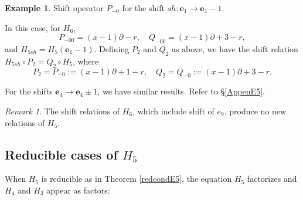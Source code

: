 \documentclass[a4paper,12pt]{article}
\theoremstyle{definition}
\newtheorem{example}[thm]{Example}
\theoremstyle{remark}
\newtheorem{remark}[thm]{Remark}
\numberwithin{equation}{section} %
\begin{document}
\begin{example} Shift operator $P_{-0}$ for the shift $sh:{\bm e}_1\to{\bm e}_1-1.$\par
\par\noindent
In this case, for $H_6$,
\[P_{-00}=(x-1)\partial-r,\quad Q_{-00}=(x-1)\partial+3-r,\]
and $H_{5sh}=H_5({\bm e}_1-1)$.
Defining $P_2$ and $Q_2$ as above,
we have the shift relation  $H_{5sh}\circ P_2 = Q_2 \circ H_5$, where
$$P_2=P_{-0}:=(x-1)\partial+1-r, \quad Q_2=Q_{-0}:=(x-1)\partial+3-r.$$
\end{example}

For the shifts ${\bm e}_4\to{\bm e}_4\pm 1$, we have similar results.
Refer to  \S \ref{AppenE5}.

\begin{remark} The shift relations of $H_6$, which include shift of $e_9$, produce no new relations of $H_5$.
\end{remark}

\subsection{Reducible cases of $H_5$}\label{E5Fact}
When $H_5$ is reducible as in Theorem \ref{redcondE5},
the equation $H_5$ factorizes and $H_4$ and $H_3$ appear as factors:
\end{document}
